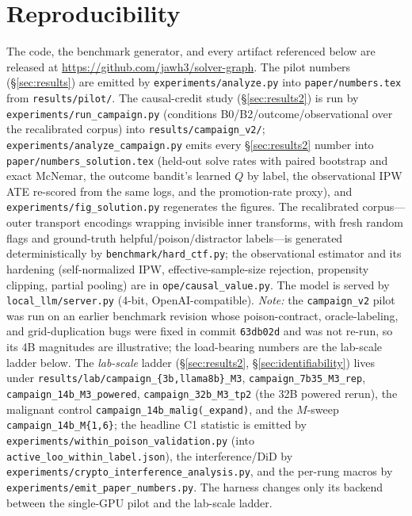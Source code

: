 \documentclass[10pt,twocolumn]{article}
\begin{document}
\section{Reproducibility}\label{app:repro}
The code, the benchmark generator, and every artifact referenced below are released at
\url{https://github.com/jawh3/solver-graph}.
The pilot numbers (\S\ref{sec:results}) are emitted by \texttt{experiments/analyze.py}
into \texttt{paper/numbers.tex} from \texttt{results/pilot/}. The causal-credit study
(\S\ref{sec:results2}) is run by \texttt{experiments/run\_campaign.py} (conditions
B0/B2/outcome/observational over the recalibrated corpus) into
\texttt{results/campaign\_v2/}; \texttt{experiments/analyze\_campaign.py} emits every
\S\ref{sec:results2} number into \texttt{paper/numbers\_solution.tex} (held-out solve
rates with paired bootstrap and exact McNemar, the outcome bandit's learned $Q$ by
label, the observational IPW ATE re-scored from the same logs, and the
promotion-rate proxy), and \texttt{experiments/fig\_solution.py} regenerates the
figures. The recalibrated corpus---outer transport encodings wrapping invisible inner
transforms, with fresh random flags and ground-truth helpful/poison/distractor
labels---is generated deterministically by \texttt{benchmark/hard\_ctf.py}; the
observational estimator and its hardening (self-normalized IPW, effective-sample-size
rejection, propensity clipping, partial pooling) are in \texttt{ope/causal\_value.py}.
The model is served by \texttt{local\_llm/server.py} (4-bit, OpenAI-compatible).
\emph{Note:} the \texttt{campaign\_v2} pilot was run on an earlier benchmark revision
whose poison-contract, oracle-labeling, and grid-duplication bugs were fixed in commit
\texttt{63db02d} and was not re-run, so its 4B magnitudes are illustrative; the
load-bearing numbers are the lab-scale ladder below.
The \emph{lab-scale} ladder (\S\ref{sec:results2}, \S\ref{sec:identifiability}) lives under
\texttt{results/lab/campaign\_\{3b,llama8b\}\_M3},
\texttt{campaign\_7b35\_M3\_rep}, \texttt{campaign\_14b\_M3\_powered},
\texttt{campaign\_32b\_M3\_tp2} (the 32B powered rerun), the malignant control
\texttt{campaign\_14b\_malig(\_expand)}, and the $M$-sweep \texttt{campaign\_14b\_M\{1,6\}};
the headline C1 statistic is emitted by \texttt{experiments/within\_poison\_validation.py}
(into \texttt{active\_loo\_within\_label.json}), the interference/DiD by
\texttt{experiments/crypto\_interference\_analysis.py}, and the per-rung macros by
\texttt{experiments/emit\_paper\_numbers.py}. The harness changes only its backend between
the single-GPU pilot and the lab-scale ladder.
\end{document}
